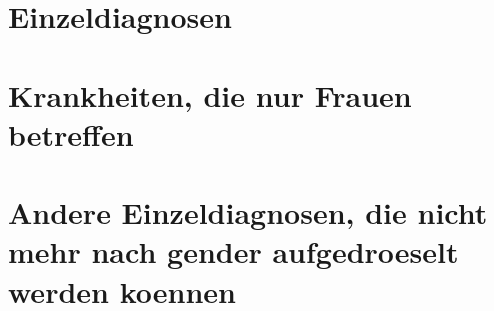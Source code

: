 \documentclass{scrartcl} %
\begin{document}
\section{Einzeldiagnosen}










\section{Krankheiten, die nur Frauen betreffen}






%
%
\section{Andere Einzeldiagnosen, die nicht mehr nach gender aufgedroeselt werden koennen}














%
%
%
%


\end{document}
